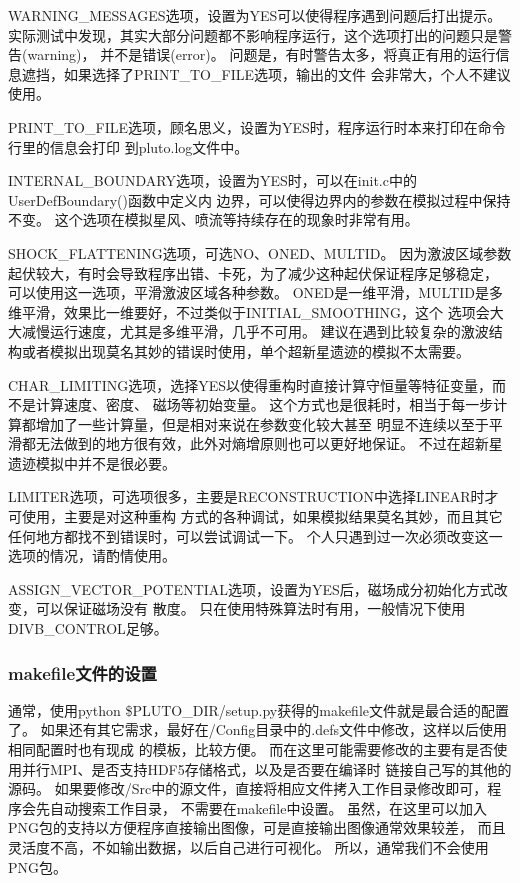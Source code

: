 WARNING\_MESSAGES选项，设置为YES可以使得程序遇到问题后打出提示。
实际测试中发现，其实大部分问题都不影响程序运行，这个选项打出的问题只是警告(warning)，
并不是错误(error)。
问题是，有时警告太多，将真正有用的运行信息遮挡，如果选择了PRINT\_TO\_FILE选项，输出的文件
会非常大，个人不建议使用。

PRINT\_TO\_FILE选项，顾名思义，设置为YES时，程序运行时本来打印在命令行里的信息会打印
到pluto.log文件中。

INTERNAL\_BOUNDARY选项，设置为YES时，可以在init.c中的UserDefBoundary()函数中定义内
边界，可以使得边界内的参数在模拟过程中保持不变。
这个选项在模拟星风、喷流等持续存在的现象时非常有用。

SHOCK\_FLATTENING选项，可选NO、ONED、MULTID。
因为激波区域参数起伏较大，有时会导致程序出错、卡死，为了减少这种起伏保证程序足够稳定，
可以使用这一选项，平滑激波区域各种参数。
ONED是一维平滑，MULTID是多维平滑，效果比一维要好，不过类似于INITIAL\_SMOOTHING，这个
选项会大大减慢运行速度，尤其是多维平滑，几乎不可用。
建议在遇到比较复杂的激波结构或者模拟出现莫名其妙的错误时使用，单个超新星遗迹的模拟不太需要。

CHAR\_LIMITING选项，选择YES以使得重构时直接计算守恒量等特征变量，而不是计算速度、密度、
磁场等初始变量。
这个方式也是很耗时，相当于每一步计算都增加了一些计算量，但是相对来说在参数变化较大甚至
明显不连续以至于平滑都无法做到的地方很有效，此外对熵增原则也可以更好地保证。
不过在超新星遗迹模拟中并不是很必要。

LIMITER选项，可选项很多，主要是RECONSTRUCTION中选择LINEAR时才可使用，主要是对这种重构
方式的各种调试，如果模拟结果莫名其妙，而且其它任何地方都找不到错误时，可以尝试调试一下。
个人只遇到过一次必须改变这一选项的情况，请酌情使用。

ASSIGN\_VECTOR\_POTENTIAL选项，设置为YES后，磁场成分初始化方式改变，可以保证磁场没有
散度。
只在使用特殊算法时有用，一般情况下使用DIVB\_CONTROL足够。

\subsubsection{makefile文件的设置}
通常，使用python \$PLUTO\_DIR/setup.py获得的makefile文件就是最合适的配置了。
如果还有其它需求，最好在/Config目录中的.defs文件中修改，这样以后使用相同配置时也有现成
的模板，比较方便。
而在这里可能需要修改的主要有是否使用并行MPI、是否支持HDF5存储格式，以及是否要在编译时
链接自己写的其他的源码。
如果要修改/Src中的源文件，直接将相应文件拷入工作目录修改即可，程序会先自动搜索工作目录，
不需要在makefile中设置。
虽然，在这里可以加入PNG包的支持以方便程序直接输出图像，可是直接输出图像通常效果较差，
而且灵活度不高，不如输出数据，以后自己进行可视化。
所以，通常我们不会使用PNG包。

